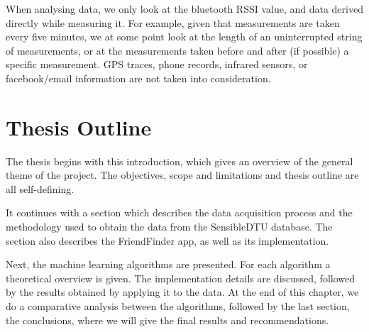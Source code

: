 When analysing data, we only look at the bluetooth RSSI value, and data derived directly while measuring it. For example, given that measurements are taken every five minutes, we at some point look at the length of an uninterrupted string of measurements, or at the measurements taken before and after (if possible) a specific measurement. GPS traces, phone records, infrared sensors, or facebook/email information are not taken into consideration.

\section{Thesis Outline}

The thesis begins with this introduction, which gives an overview of the general theme of the project. The objectives, scope and limitations and thesis outline are all self-defining. 

It continues with a section which describes the data acquisition process and the methodology used to obtain the data from the SensibleDTU database. The section also describes the FriendFinder app, as well as its implementation.

Next, the machine learning algorithms are presented. For each algorithm a theoretical overview is given. The implementation details are discussed, followed by the results obtained by applying it to the data. At the end of this chapter, we do a comparative analysis between the algorithms, followed by the last section, the conclusions, where we will give the final results and recommendations.

